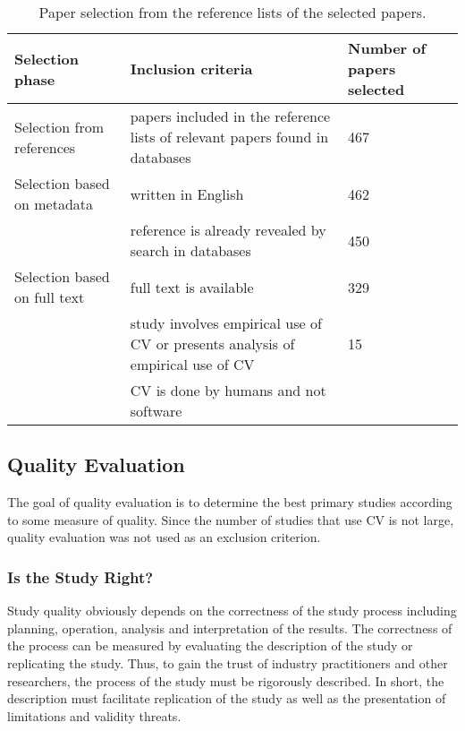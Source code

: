 %
\begin{table}
\caption{\label{tab:Paper-Selection-from}Paper selection from the reference lists of the selected papers.}

\begin{tabular}{|>{\raggedright}p{}|>{\raggedright}p{}|>{\raggedright}p{}|}
\hline 
Selection phase & Inclusion criteria & Number of papers selected\tabularnewline
\hline\hline
Selection from references & papers included in the reference lists of relevant papers found in databases & 467 \tabularnewline
\hline 


Selection based on metadata & written in English & 462 \tabularnewline
\cline{2-3}
& reference is already revealed by search in databases & 450 \tabularnewline
\hline
Selection based on full text & full text is available  & 329 \tabularnewline
\cline{2-3}
& study involves empirical use of CV or presents analysis of empirical use of CV & 15 \tabularnewline
\cline{2-2}
& CV is done by humans and not software & \tabularnewline
\hline


\end{tabular}%
\end{table}


\subsection{\label{QE}Quality Evaluation}

The goal of quality evaluation is to determine the best primary studies according to some measure of quality.
Since the number of studies that use CV is not large, quality evaluation was not used as an exclusion criterion.

\subsubsection{Is the Study Right?}

Study quality obviously depends on the correctness of the study process including planning, operation, analysis and interpretation of the results. The correctness of the process can be measured by evaluating the description of the study or replicating the study. Thus, to gain the trust of industry practitioners and other researchers, the process of the study must be rigorously described. In short, the description must facilitate replication of the study as well as the presentation of limitations and validity threats.

